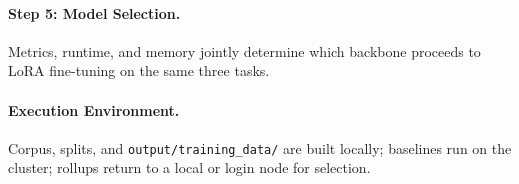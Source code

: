 \paragraph{Step 5: Model Selection.}
Metrics, runtime, and memory jointly determine which backbone proceeds to LoRA fine-tuning on the same three tasks.

\paragraph{Execution Environment.}
Corpus, splits, and \texttt{output/training\_data/} are built locally; baselines run on the cluster; rollups return to a local or login node for selection.
